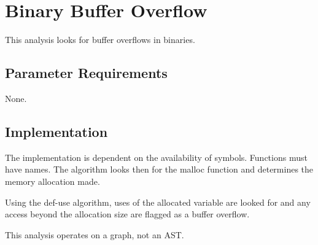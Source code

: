 %
%

\section{Binary Buffer Overflow}
\label{BinaryBufferOverflow::overview}

This analysis looks for buffer overflows in binaries.

\subsection{Parameter Requirements}

None.

\subsection{Implementation}

The implementation is dependent on the availability of symbols.
Functions must have names. The algorithm looks then for the malloc function
and determines the memory allocation made.

Using the def-use algorithm, uses of the allocated variable are looked for
and any access beyond the allocation size are flagged as a buffer overflow.

This analysis operates on a graph, not an AST.

